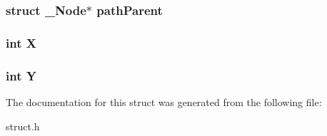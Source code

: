 \subsubsection[{\texorpdfstring{path\+Parent}{pathParent}}]{\setlength{\rightskip}{0pt plus 5cm}struct {\bf \+\_\+\+Node}$\ast$ path\+Parent}\hypertarget{struct___node_a7d0cf1a91c4dd335673a79aa5db87d01}{}\label{struct___node_a7d0cf1a91c4dd335673a79aa5db87d01}
\subsubsection[{\texorpdfstring{X}{X}}]{\setlength{\rightskip}{0pt plus 5cm}int X}\hypertarget{struct___node_a80c0944640e62d3ed6c5419c1bcc0c88}{}\label{struct___node_a80c0944640e62d3ed6c5419c1bcc0c88}
\subsubsection[{\texorpdfstring{Y}{Y}}]{\setlength{\rightskip}{0pt plus 5cm}int Y}\hypertarget{struct___node_aa482c4cc86a24474e4fb19b5b5978778}{}\label{struct___node_aa482c4cc86a24474e4fb19b5b5978778}


The documentation for this struct was generated from the following file\+:\begin{DoxyCompactItemize}
\item 
struct.\+h\end{DoxyCompactItemize}
